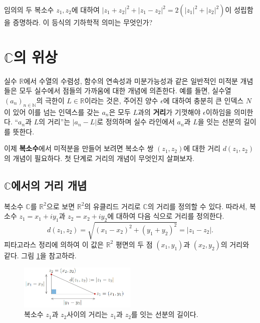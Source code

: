 \begin{salt_exercise} \label{ex-1-21}
임의의 두 복소수 $z_1, z_2$에 대하여
$|z_1+z_2|^2 + |z_1-z_2|^2 =2(|z_1|^2+|z_2|^2)$이 성립함을 증명하라.
이 등식의 기하학적 의미는 무엇인가?
\end{salt_exercise}

\section{$\mathbb C$의 위상}

실수 $\mathbb R$에서 수열의 수렴성, 함수의 연속성과 미분가능성과 같은
일반적인 미적분 개념들은 모두 실수에서 점들의 가까움에 대한 개념에 의존한다.
예를 들면, 실수열 $(a_n)_{n\in\mathbb N}$의 극한이 $L\in\mathbb R$이라는 것은,
주어진 양수 $\epsilon$에 대하여 충분히 큰 인덱스 $N$이 있어 이를 넘는 인덱스를 갖는
 $a_n$은 모두 $L$과의 {\bf 거리}가 기껏해야 $\epsilon$이하임을 의미한다.
``$a_n$과  $L$의 거리''는 $|a_n-L|$로 정의하며
실수 라인에서 $a_n$과 $L$을 잇는 선분의 길이를 뜻한다.

이제 {\bf 복소수}에서 미적분을 만들어 보려면
복소수 쌍 $(z_1, z_2)$에 대한 거리 $d(z_1, z_2)$의 개념이 필요하다.
첫 단계로 거리의 개념이 무엇인지 살펴보자.

\subsection{$\mathbb C$에서의 거리 개념}

복소수 $\mathbb C$를 $\mathbb R^2$으로 보면 $\mathbb R^2$의 유클리드 거리로
$\mathbb C$의 거리를 정의할 수 있다.
따라서, 복소수 $z_1=x_1+iy_1$과 $z_2=x_2+iy_2$에 대하여 
다음 식으로 거리를 정의한다.
$$
d(z_1,z_2) = \sqrt{(x_1-x_2)^2 + (y_1+y_2)^2} = |z_1-z_2|.
$$
피타고라스 정리에 의하여 이 값은 $\mathbb R^2$ 평면의 두 점 $(x_1, y_1)$과 $(x_2, y_2)$의 거리와 같다.
그림 \ref{fig-1-10}을 참고하라.

\begin{figure}[!h]
\begin{center}
\includegraphics[width=0.5\textwidth]{./SaltChapter/figs/fig-1-10}
\end{center}
\caption{복소수 $z_1$과 $z_2$사이의 거리는 $z_1$과 $z_2$를 잇는 선분의 길이다.}
\label{fig-1-10}
\end{figure}


